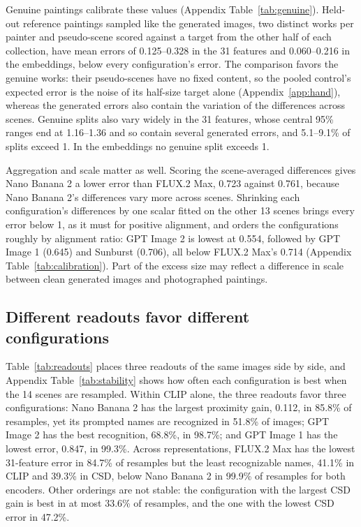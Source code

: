 \documentclass[10pt]{article}
\begin{document}
Genuine paintings calibrate these values (Appendix Table~\ref{tab:genuine}). Held-out reference
paintings sampled like the generated images, two distinct works per painter and pseudo-scene
scored against a target from the other half of each collection, have mean errors of 0.125--0.328
in the 31 features and 0.060--0.216 in the embeddings, below every configuration's error. The
comparison favors the genuine works: their pseudo-scenes have no fixed content, so the pooled
control's expected error is the noise of its half-size target alone (Appendix~\ref{app:hand}),
whereas the generated errors also contain the variation of the differences across scenes. Genuine
splits also vary widely in the 31 features, whose central 95\% ranges end at 1.16--1.36 and so
contain several generated errors, and 5.1--9.1\% of splits exceed 1. In the embeddings no genuine
split exceeds 1.

Aggregation and scale matter as well. Scoring the scene-averaged differences gives Nano Banana 2 a
lower error than FLUX.2 Max, 0.723 against 0.761, because Nano Banana 2's differences vary more
across scenes. Shrinking each configuration's differences by one scalar fitted on the other 13
scenes brings every error below 1, as it must for positive alignment, and orders the configurations
roughly by alignment ratio: GPT Image 2 is lowest at 0.554, followed by GPT Image 1 (0.645) and
Sunburst (0.706), all below FLUX.2 Max's 0.714 (Appendix Table~\ref{tab:calibration}). Part of the
excess size may reflect a difference in scale between clean generated images and photographed
paintings.

\subsection{Different readouts favor different configurations}\label{sec:readouts}

Table~\ref{tab:readouts} places three readouts of the same images side by side, and Appendix
Table~\ref{tab:stability} shows how often each configuration is best when the 14 scenes are
resampled. Within CLIP alone, the three readouts favor three configurations: Nano Banana 2 has the
largest proximity gain, 0.112, in 85.8\% of resamples, yet its prompted names are recognized in
51.8\% of images; GPT Image 2 has the best recognition, 68.8\%, in 98.7\%; and GPT Image 1 has the
lowest error, 0.847, in 99.3\%. Across representations, FLUX.2 Max has the lowest 31-feature error
in 84.7\% of resamples but the least recognizable names, 41.1\% in CLIP and 39.3\% in CSD, below
Nano Banana 2 in 99.9\% of resamples for both encoders. Other orderings are not stable: the
configuration with the largest CSD gain is best in at most 33.6\% of resamples, and the one with the
lowest CSD error in 47.2\%.
\end{document}
